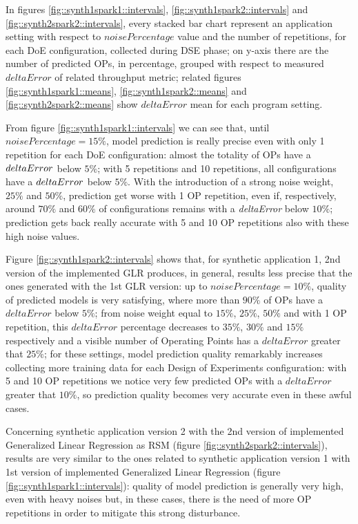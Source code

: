 In figures \ref{fig::synth1spark1::intervals}, \ref{fig::synth1spark2::intervals} and \ref{fig::synth2spark2::intervals}, every stacked bar chart represent an application setting with respect to $noisePercentage$ value and the number of repetitions, for each DoE configuration, collected during DSE phase; on y-axis there are the number of predicted OPs, in percentage, grouped with respect to measured $deltaError$ of related throughput metric; related figures \ref{fig::synth1spark1::means}, \ref{fig::synth1spark2::means} and \ref{fig::synth2spark2::means} show $deltaError$ mean for each program setting.

From figure \ref{fig::synth1spark1::intervals} we can see that, until $noisePercentage = 15\%$, model prediction is really precise even with only 1 repetition for each DoE configuration: almost the totality of OPs have a $del\-ta\-Er\-ror$ below $5\%$; with 5 repetitions and 10 repetitions, all configurations have a $del\-ta\-Er\-ror$ below $5\%$. With the introduction of a strong noise weight, $25\%$ and $50\%$, prediction get worse with 1 OP repetition, even if, respectively, around $70\%$ and $60\%$ of configurations remains with a \textit{deltaError} below $10\%$; prediction gets back really accurate with 5 and 10 OP repetitions also with these high noise values.

Figure \ref{fig::synth1spark2::intervals} shows that, for synthetic application 1, 2nd version of the implemented GLR produces, in general, results less precise that the ones generated with the 1st GLR version: up to $noisePercentage = 10\%$, quality of predicted models is very satisfying, where more than $90\%$ of OPs have a $deltaError$ below $5\%$; from noise weight equal to $15\%$, $25\%$, $50\%$ and with 1 OP repetition, this $deltaError$ percentage decreases to $35\%$, $30\%$ and $15\%$ respectively and a visible number of Operating Points has a $deltaError$ greater that $25\%$; for these settings, model prediction quality remarkably increases collecting more training data for each Design of Experiments configuration: with 5 and 10 OP repetitions we notice very few predicted OPs with a $deltaError$ greater that $10\%$, so prediction quality becomes very accurate even in these awful cases.

Concerning synthetic application version 2 with the 2nd version of implemented Generalized Linear Regression as RSM (figure \ref{fig::synth2spark2::intervals}), results are very similar to the ones related to synthetic application version 1 with 1st version of implemented Generalized Linear Regression (figure \ref{fig::synth1spark1::intervals}): quality of model prediction is generally very high, even with heavy noises but, in these cases, there is the need of more OP repetitions in order to mitigate this strong disturbance.

